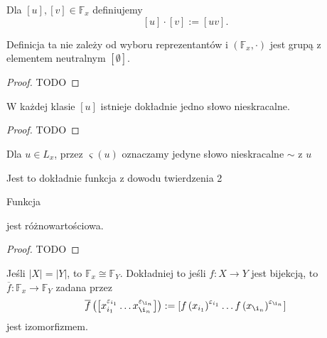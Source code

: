 \begin{theorem}
	Dla $\left[ u \right] , \left[ v \right] \in \mathbb{F}_{x}$ definiujemy
	\[
	\left[ u \right] \cdot \left[ v \right] := \left[ uv \right] 
	.\] 

	Definicja ta nie zależy od wyboru reprezentantów i $\left( \mathbb{F}_{x}, \cdot \right) $ jest grupą z elementem neutralnym $\left[ \emptyset  \right] $.
\end{theorem} 
\begin{proof}
	TODO
\end{proof} 
\begin{theorem}
	W każdej klasie $\left[ u \right] $ istnieje dokładnie jedno słowo nieskracalne.
\end{theorem} 
\begin{proof}
	TODO
\end{proof} 
\begin{definition}
	Dla $u \in L_{x}$, przez $\varsigma \left( u \right)$ oznaczamy jedyne słowo nieskracalne $\sim  $ z $u$
\end{definition} 
\begin{remark}
	Jest to dokładnie funkcja z dowodu twierdzenia 2
\end{remark} 
\begin{corollary}

	Funkcja
	\begin{figure}[H] %
	        \centering
	\end{figure}
	
	jest różnowartościowa.
\end{corollary}
\begin{proof}
	TODO
\end{proof} 
\begin{remark}
	Jeśli $\left| X \right| = \left| Y \right| $, to $\mathbb{F}_{x}\cong \mathbb{F}_{Y}$. Dokładniej to jeśli $f:X\to Y$ jest bijekcją, to $\overline{f}: \mathbb{F} _{x}\to \mathbb{F} _{Y}$ zadana przez 
	 \[
		 \overline{f}\left( \left[x_{i_1}^{\varepsilon _{i_1}}\ldots x_{\i_{n} }^{\varepsilon_{\i_{n} }} \right]  \right) := \left[ f\left( x_{i_1} \right)^{\varepsilon_{i_1}}\ldots f\left( x_{\i_{n} } \right)^{\varepsilon_{\i_{n} }} \right] 
	\] 
	jest izomorfizmem.
\end{remark} 
